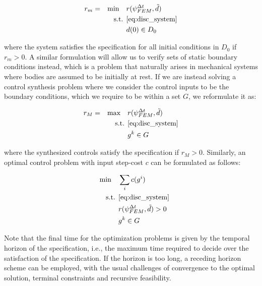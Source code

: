 \documentclass{article}
\begin{document}
\begin{equation}
    \label{eq:stl_set_opt}
    \begin{aligned}
        &r_m = &\min \quad &r(\psi^{\Delta t}_{FEM}, \tilde{d}) \\
        &  &\text{s.t. } &\cref{eq:disc_system} \\
        &  & &d(0) \in D_0
    \end{aligned}
\end{equation}

where the system satisfies the specification for all initial conditions in $D_0$
if $r_m > 0$. A similar formulation will allow us to verify sets of static
boundary conditions instead, which is a problem that naturally arises in
mechanical systems where bodies are assumed to be initially at rest. 
If we are instead solving a control synthesis problem where we
consider the control inputs to be the boundary conditions, which we require to
be within a set $G$, we reformulate it as:

\begin{equation}
    \label{eq:stl_ctrl_opt}
    \begin{aligned}
        &r_M = &\max \quad &r(\psi^{\Delta t}_{FEM}, \tilde{d}) \\
        &  &\text{s.t. } &\cref{eq:disc_system} \\
        &  & &g^k \in G
    \end{aligned}
\end{equation}

where the synthesized controls satisfy the specification if $r_M > 0$.
Similarly, an optimal control problem with input step-cost $c$ can be formulated
as follows:

\begin{equation}
    \label{eq:stl_opt_ctrl_opt}
    \begin{aligned}
        &  &\min \quad &\sum_i c(g^i) \\
        &  &\text{s.t. } &\cref{eq:disc_system} \\
        &  & &r(\psi^{\Delta t}_{FEM}, \tilde{d}) > 0\\
        &  & &g^k \in G
    \end{aligned}
\end{equation}

Note that the final time for the optimization problems is given by the temporal
horizon of the specification, i.e., the maximum time required to decide over the
satisfaction of the specification. If the horizon is too long, a receding
horizon scheme can be employed, with the usual challenges of convergence to the
optimal solution, terminal constraints and recursive feasibility.
\end{document}
